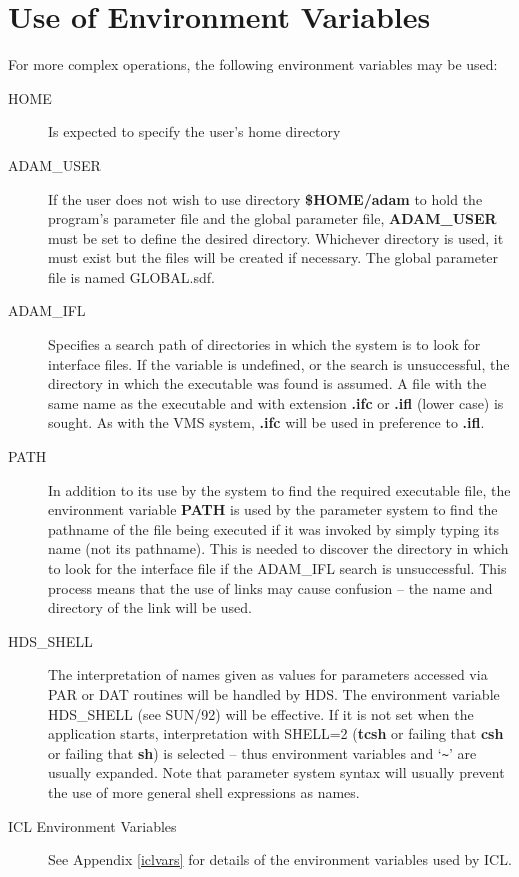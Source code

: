 \section{Use of Environment Variables}
\label{envars}
For more complex operations, the following environment variables may be used:
\begin{description}
\item[HOME] Is expected to specify the user's home directory
\item[ADAM\_USER] If the user does not wish to use directory {\bf \$HOME/adam}
to hold the program's parameter file and the global parameter file,
{\bf ADAM\_USER} must be set to define the desired directory.
Whichever directory is used, it must exist but the files will be created if 
necessary.
The global parameter file is named GLOBAL.sdf.
\item[ADAM\_IFL] Specifies a search path of directories in which the system is 
to look for interface files. 
If the variable is undefined, or the search is unsuccessful, the directory in
which the executable was found is assumed.
A file with the same name as the executable and with extension {\bf .ifc} or 
{\bf .ifl} (lower case) is sought.
As with the VMS system, {\bf .ifc} will be used in preference to {\bf .ifl}.
\item[PATH] In addition to its use by the system to find the required
executable file, the environment variable {\bf PATH} is used by the parameter
system to find the pathname of the file being executed if it was invoked by 
simply typing its name (not its pathname).
This is needed to discover the directory in which to look for the interface 
file if the ADAM\_IFL search is unsuccessful.
This process means that the use of links may cause confusion -- the name and
directory of the link will be used.
\item[HDS\_SHELL] The interpretation of names given as values for parameters
accessed via PAR or DAT routines will be handled by HDS.
The environment variable HDS\_SHELL (see SUN/92) will be effective.
If it is not set when the application starts, interpretation with SHELL=2
({\bf tcsh} or failing that {\bf csh} or failing that {\bf sh}) is selected 
-- thus environment variables and `\verb!~!' are usually expanded.
Note that parameter system syntax will usually prevent the use of more general 
shell expressions as names.
\item[ICL Environment Variables] See Appendix \ref{iclvars} for details of the
environment variables used by ICL.
\end{description}

